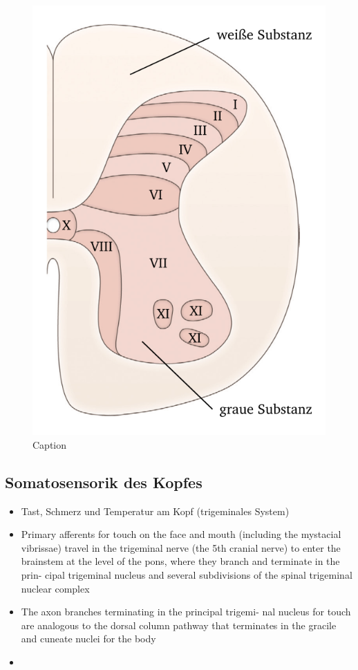 \documentclass[12pt,a4paper,pdftex]{article}
\begin{document}
\begin{figure}
        \centering
        \includegraphics{pictures/somatosensory/graymatter2.png}
        \caption{Caption}
        \label{fig:graymatter}
    \end{figure}


\subsection{Somatosensorik des Kopfes}
\begin{itemize}
    \item Tast, Schmerz und Temperatur am Kopf (trigeminales System)
    \item Primary
afferents for touch on the face and mouth (including the
mystacial vibrissae) travel in the trigeminal nerve (the 5th cranial nerve) to enter the brainstem at the level of
the pons, where they branch and terminate in the prin-
cipal trigeminal nucleus and several subdivisions of the
spinal trigeminal nuclear complex \cite{paxinos2014rat}
\item The axon branches terminating in the principal trigemi-
nal nucleus for touch are analogous to the dorsal column
pathway that terminates in the gracile and cuneate nuclei
for the body \cite{paxinos2014rat}
\item
\end{itemize}
\end{document}
